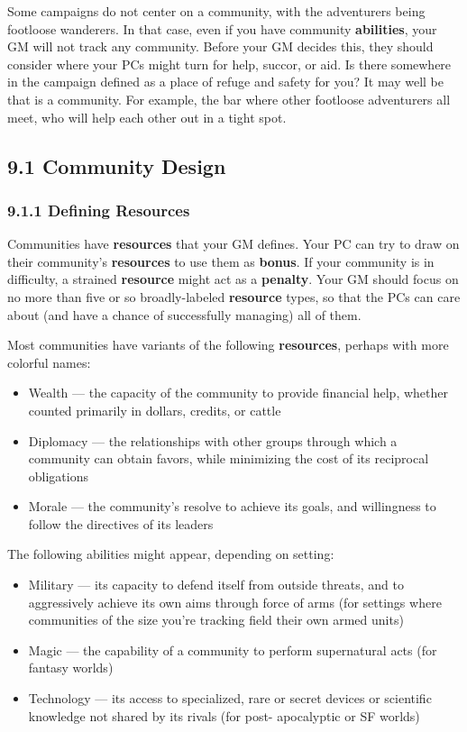 \documentclass[
  11pt,
]{article}
\providecommand{\tightlist}{%
  \setlength{\itemsep}{0pt}\setlength{\parskip}{0pt}}
\begin{document}
Some campaigns do not center on a community, with the adventurers being
footloose wanderers. In that case, even if you have community
\textbf{abilities}, your GM will not track any community. Before your GM
decides this, they should consider where your PCs might turn for help,
succor, or aid. Is there somewhere in the campaign defined as a place of
refuge and safety for you? It may well be that is a community. For
example, the bar where other footloose adventurers all meet, who will
help each other out in a tight spot.

\hypertarget{community-design}{%
\subsection{9.1 Community Design}\label{community-design}}

\hypertarget{defining-resources}{%
\subsubsection{9.1.1 Defining Resources}\label{defining-resources}}

Communities have \textbf{resources} that your GM defines. Your PC can
try to draw on their community's \textbf{resources} to use them as
\textbf{bonus}. If your community is in difficulty, a strained
\textbf{resource} might act as a \textbf{penalty}. Your GM should focus
on no more than five or so broadly-labeled \textbf{resource} types, so
that the PCs can care about (and have a chance of successfully managing)
all of them.

Most communities have variants of the following \textbf{resources},
perhaps with more colorful names:

\begin{itemize}
\tightlist
\item
  Wealth --- the capacity of the community to provide financial help,
  whether counted primarily in dollars, credits, or cattle
\item
  Diplomacy --- the relationships with other groups through which a
  community can obtain favors, while minimizing the cost of its
  reciprocal obligations
\item
  Morale --- the community's resolve to achieve its goals, and
  willingness to follow the directives of its leaders
\end{itemize}

The following abilities might appear, depending on setting:

\begin{itemize}
\tightlist
\item
  Military --- its capacity to defend itself from outside threats, and
  to aggressively achieve its own aims through force of arms (for
  settings where communities of the size you're tracking field their own
  armed units)
\item
  Magic --- the capability of a community to perform supernatural acts
  (for fantasy worlds)
\item
  Technology --- its access to specialized, rare or secret devices or
  scientific knowledge not shared by its rivals (for post- apocalyptic
  or SF worlds)
\end{itemize}
\end{document}

